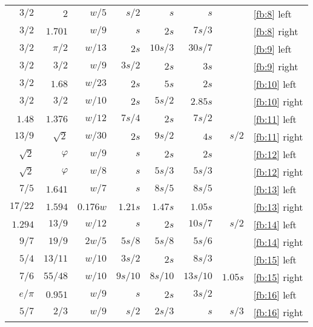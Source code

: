 \documentclass[10pt,a4paper,extrafontsizes]{memoir}
\begin{document}
\begin{table}
\begin{tabular}{|r|r|rrrrr|l|}
$3/2$      & $2$     & $w/5$    & $s/2$  & $s$     & $s$     &       & \ref{fb:8} left \\ %
$3/2$      & $1.701$ & $w/9$    & $s$    & $2s$    & $7s/3$  &       & \ref{fb:8} right \\ %
$3/2$      & $\pi/2$ & $w/13$   & $2s$   & $10s/3$ & $30s/7$ &       & \ref{fb:9} left \\ %
$3/2$      & $3/2$   & $w/9$    & $3s/2$ & $2s$    & $3s$    &       & \ref{fb:9} right \\ %
$3/2$      & $1.68$  & $w/23$   & $2s$   & $5s$    & $2s$    &       & \ref{fb:10} left \\ %
$3/2$      & $3/2$   & $w/10$   & $2s$   & $5s/2$  & $2.85s$ &       & \ref{fb:10} right \\ %
$1.48$     & $1.376$ & $w/12$   & $7s/4$ & $2s$    & $7s/2$  &       & \ref{fb:11} left \\ %
$13/9$     & $\sqrt{2}$ & $w/30$ & $2s$  & $9s/2$  & $4s$    & $s/2$ & \ref{fb:11} right \\ %
$\sqrt{2}$ & $\varphi$ & $w/9$  & $s$    & $2s$    & $2s$    &       & \ref{fb:12} left \\ %
$\sqrt{2}$ & $\varphi$ & $w/8$  & $s$    & $5s/3$  & $5s/3$  &       & \ref{fb:12} right \\ %
$7/5$      & $1.641$   & $w/7$  & $s$    & $8s/5$  & $8s/5$  &       & \ref{fb:13} left \\ %
$17/22$    & $1.594$ & $0.176w$ & $1.21s$ & $1.47s$ & $1.05s$ &      & \ref{fb:13} right \\ %
$1.294$    & $13/9$  & $w/12$   & $s$    & $2s$    & $10s/7$ & $s/2$ & \ref{fb:14} left \\ %
$9/7$      & $19/9$  & $2w/5$   & $5s/8$ & $5s/8$  & $5s/6$  &       & \ref{fb:14} right \\ %
$5/4$      & $13/11$ & $w/10$   & $3s/2$ & $2s$    & $8s/3$  &       & \ref{fb:15} left \\ %
$7/6$      & $55/48$ & $w/10$   & $9s/10$ & $8s/10$ & $13s/10$ & $1.05s$ & \ref{fb:15} right \\ %
$e/\pi$    & $0.951$ & $w/9$    & $s$    & $2s$    & $3s/2$  &       & \ref{fb:16} left \\ %
$5/7$      & $2/3$   & $w/9$    & $s/2$  & $2s/3$  & $s$     & $s/3$ & \ref{fb:16} right \\ \hline %
\end{tabular}
\end{table}
\end{document}
